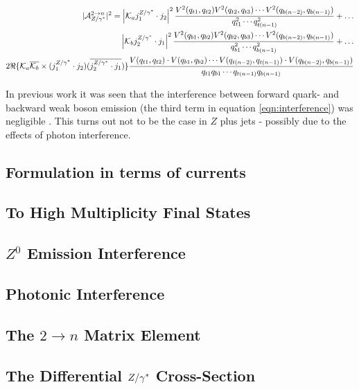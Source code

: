 		\begin{align}
		\begin{split}
		|\mathcal{A}_{Z/\gamma^*}^{2\rightarrow n}|^2 = \left|\mathcal{K}_a j_1^{Z/\gamma^*}\cdot j_2\right|^2 \frac{V^2(q_{t1}, q_{t2}) V^2(q_{t2}, q_{t3}) \cdots V^2(q_{b(n-2)}, q_{b(n-1)})}{q^2_{t1}\cdots q^2_{t(n-1)}} +\ldots\\
		\left|\mathcal{K}_b j_2^{Z/\gamma^*}\cdot j_1\right|^2 \frac{V^2(q_{b1}, q_{b2}) V^2(q_{b2}, q_{b3}) \cdots V^2(q_{b(n-2)}, q_{b(n-1)})}{q^2_{b1}\cdots q^2_{b(n-1)}} +\ldots\\
		2\Re\{\mathcal{K}_a\overline{\mathcal{K}_b} \times (j_1^{Z/\gamma^*}\cdot j_2)(\overline{j_2^{Z/\gamma^*}\cdot j_1})\}\frac{V(q_{t1}, q_{t2})\cdot V(q_{b1}, q_{b2})\cdots V(q_{t(n-2)}, q_{t(n-1)})\cdot V(q_{b(n-2)}, q_{b(n-1)})}{q_{t1}q_{b1}\cdots q_{t(n-1)}q_{b(n-1)}}
		\label{eqn:interference}
		\end{split}
		\end{align}

		In previous work it was seen that the interference between forward quark- and backward weak boson emission (the third term in equation \ref{eqn:interference}) was negligible \cite{Wjets}.  This turns out not to be the case in $Z$ plus jets - possibly due to the effects of photon interference.

		\subsection{Formulation in terms of currents}

		\subsection{To High Multiplicity Final States}

		\subsection{$Z^0$ Emission Interference}

		\subsection{Photonic Interference}

		\subsection{The $2\rightarrow n$ Matrix Element}

		\subsection{The Differential ${Z/\gamma^*}$ Cross-Section}

